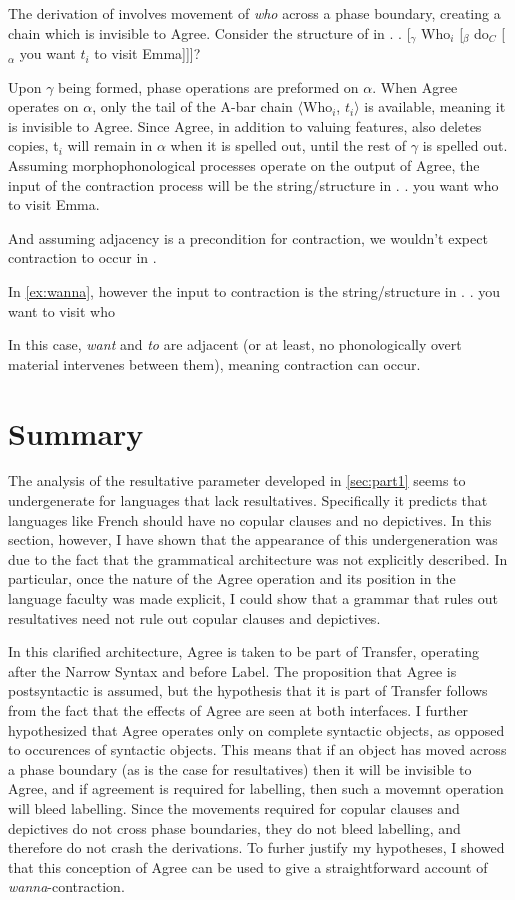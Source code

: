 \documentclass[MilwayThesis]{subfiles}
\begin{document}
The derivation of \Last[b] involves movement of \textit{who} across a phase boundary, creating a chain which is invisible to Agree.
Consider the structure of \Last[b] in \Next.
\ex. \label{fig:star-wanna-tree}
[$_\gamma$ Who$_i$ [$_\beta$ do$_C$ [$_\alpha$ you want $t_i$ to visit Emma]]]?

Upon $\gamma$ being formed, phase operations are preformed on $\alpha$.
When Agree operates on $\alpha$, only the tail of the A-bar chain $\langle$Who$_i$, $t_i\rangle$ is available, meaning it is invisible to Agree.
Since Agree, in addition to valuing features, also deletes copies, t$_i$ will remain in $\alpha$ when it is spelled out, until the rest of $\gamma$ is spelled out.
Assuming morphophonological processes operate on the output of Agree, the input of the contraction process will be the string/structure in \Next.
\ex. you want who to visit Emma.

And assuming adjacency is a precondition for contraction, we wouldn't expect contraction to occur in \Last.

In \ref{ex:wanna}, however the input to contraction is the string/structure in \Next.
\ex. you want to visit who

In this case, \textit{want} and \textit{to} are adjacent (or at least, no phonologically overt material intervenes between them), meaning contraction can occur.

\section{Summary}
The analysis of the resultative parameter developed in \cref{sec:part1} seems to undergenerate for languages that lack resultatives.
Specifically it predicts that languages like French should have no copular clauses and no depictives.
In this section, however, I have shown that the appearance of this undergeneration was due to the fact that the grammatical architecture was not explicitly described.
In particular, once the nature of the Agree operation and its position in the language faculty was made explicit, I could show that a grammar that rules out resultatives need not rule out copular clauses and depictives.

In this clarified architecture, Agree is taken to be part of Transfer, operating after the Narrow Syntax and before Label.
The proposition that Agree is postsyntactic is assumed, but the hypothesis that it is part of Transfer follows from the fact that the effects of Agree are seen at both interfaces.
I further hypothesized that Agree operates only on complete syntactic objects, as opposed to occurences of syntactic objects.
This means that if an object has moved across a phase boundary (as is the case for resultatives) then it will be invisible to Agree, and if agreement is required for labelling, then such a movemnt operation will bleed labelling.
Since the movements required for copular clauses and depictives do not cross phase boundaries, they do not bleed labelling, and therefore do not crash the derivations.
To furher justify my hypotheses, I showed that this conception of Agree can be used to give a straightforward account of \textit{wanna}-contraction.
\end{document}

